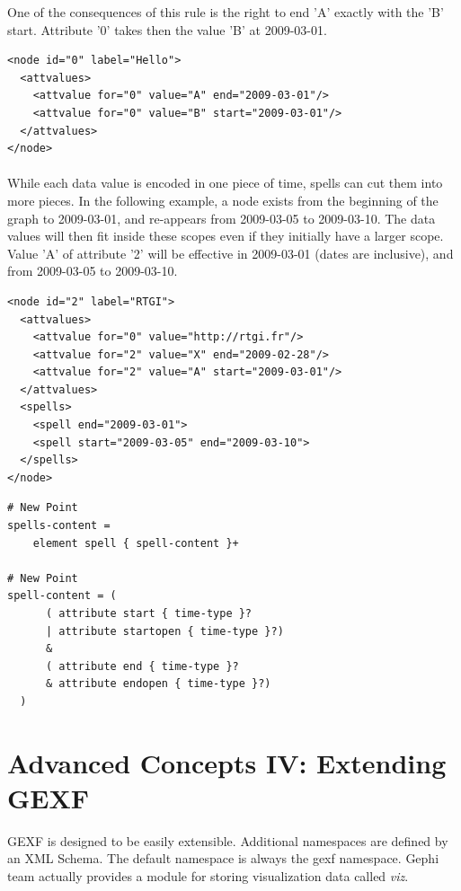 \documentclass[a4paper,10pt]{article}
\begin{document}
One of the consequences of this rule is the right to end 'A' exactly with the 'B' start. Attribute '0' takes then the value 'B' at 2009-03-01.

\lstset{ style=gexf }
\begin{lstlisting}[caption={Value transition}]
<node id="0" label="Hello">
  <attvalues>
    <attvalue for="0" value="A" end="2009-03-01"/>
    <attvalue for="0" value="B" start="2009-03-01"/>
  </attvalues>
</node>
\end{lstlisting}

\paragraph{}
While each data value is encoded in one piece of time, spells can cut them into more pieces. In the following example, a node exists from the beginning of the graph to 2009-03-01, and re-appears from 2009-03-05 to 2009-03-10. The data values will then fit inside these scopes even if they initially have a larger scope. Value 'A' of attribute '2' will be effective in 2009-03-01 (dates are inclusive), and from 2009-03-05 to 2009-03-10.

\lstset{ style=gexf }
\begin{lstlisting}[caption={Spells}]
<node id="2" label="RTGI">
  <attvalues>
    <attvalue for="0" value="http://rtgi.fr"/>
    <attvalue for="2" value="X" end="2009-02-28"/>
    <attvalue for="2" value="A" start="2009-03-01"/>
  </attvalues>
  <spells>
    <spell end="2009-03-01">
    <spell start="2009-03-05" end="2009-03-10">
  </spells>
</node>
\end{lstlisting}

\lstset{ style=rnc }
\begin{lstlisting}[caption={Spells Specification},label=dynspellsRNC]
# New Point
spells-content =
    element spell { spell-content }+

# New Point
spell-content = (
      ( attribute start { time-type }?
      | attribute startopen { time-type }?)
      &
      ( attribute end { time-type }?
      & attribute endopen { time-type }?)
  )
\end{lstlisting}

\section{Advanced Concepts IV: Extending GEXF} \label{extendgexf}

GEXF is designed to be easily extensible. Additional namespaces are defined by an XML Schema. The default namespace is always the gexf namespace. Gephi team actually provides a module for storing visualization data called \textit{viz}.
\end{document}
